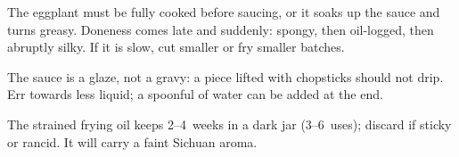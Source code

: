 \notes{} The eggplant must be fully cooked before saucing, or it soaks
up the sauce and turns greasy.  Doneness comes late and suddenly:
spongy, then oil-logged, then abruptly silky.  If it is slow, cut
smaller or fry smaller batches.

The sauce is a glaze, not a gravy: a piece lifted with chopsticks
should not drip.  Err towards less liquid; a spoonful of water can be
added at the end.

The strained frying oil keeps 2--4~weeks in a dark jar (3--6~uses);
discard if sticky or rancid.  It will carry a faint Sichuan aroma.

